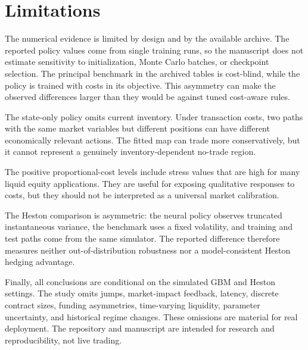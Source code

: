 \section{Limitations}
\label{sec:limitations}

The numerical evidence is limited by design and by the available archive. The
reported policy values come from single training runs, so the manuscript does
not estimate sensitivity to initialization, Monte Carlo batches, or checkpoint
selection. The principal benchmark in the archived tables is cost-blind, while
the policy is trained with costs in its objective. This asymmetry can make the
observed differences larger than they would be against tuned cost-aware rules.

The state-only policy omits current inventory. Under transaction costs, two
paths with the same market variables but different positions can have different
economically relevant actions. The fitted map can trade more conservatively,
but it cannot represent a genuinely inventory-dependent no-trade region.

The positive proportional-cost levels include stress values that are high for
many liquid equity applications. They are useful for exposing qualitative
responses to costs, but they should not be interpreted as a universal market
calibration.

The Heston comparison is asymmetric: the neural policy observes truncated
instantaneous variance, the benchmark uses a fixed volatility, and training and
test paths come from the same simulator. The reported difference therefore
measures neither out-of-distribution robustness nor a model-consistent Heston
hedging advantage.

Finally, all conclusions are conditional on the simulated GBM and Heston
settings. The study omits jumps, market-impact feedback, latency, discrete
contract sizes, funding asymmetries, time-varying liquidity, parameter
uncertainty, and historical regime changes. These omissions are material for
real deployment. The repository and manuscript are intended for research and
reproducibility, not live trading.
